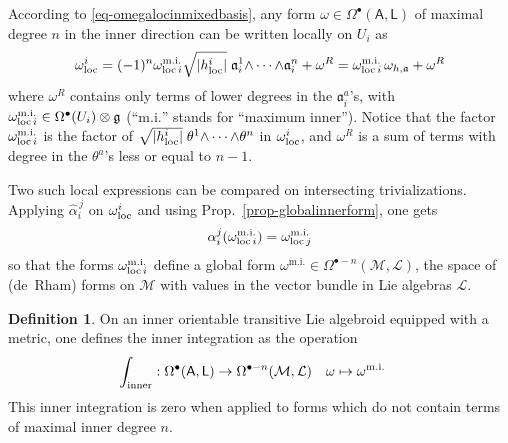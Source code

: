 \documentclass[number]{elsarticle}
\theoremstyle{definition}
\newtheorem{definition}[theorem]{Definition}
\theoremstyle{remark}
\numberwithin{equation}{section}
\begin{document}
According to \eqref{eq-omegalocinmixedbasis}, any form $\omega \in \Omega^{\bullet}({{{{\mathbf{\mathsf{{A}}}}}}}, {{{{\mathbf{\mathsf{{L}}}}}}})$ of maximal degree $n$ in the inner direction can be written locally on $U_i$ as 
\begin{equation*}
\omega^i_{{\text{\textup{loc}}}} = (-1)^n \omega^{{\text{m.i.}}}_{{{\text{\textup{loc}}}}\, i} \sqrt{|h^i_{{\text{\textup{loc}}}}|}\; {\mathfrak{a}}_i^{1} {\mathord{\wedge}} \cdots {\mathord{\wedge}} {\mathfrak{a}}_i^{n} + \omega^R
= \omega^{{\text{m.i.}}}_{{{\text{\textup{loc}}}}\, i}\, \omega_{h,{\mathfrak{a}}} + \omega^R
\end{equation*}
where $\omega^R$ contains only terms of lower degrees in the ${\mathfrak{a}}_i^a$'s, with $\omega^{{\text{m.i.}}}_{{{\text{\textup{loc}}}}\, i} \in \Omega^{\bullet}(U_i) \otimes {{\mathfrak g}}$ (``${{\text{m.i.}}}$'' stands for ``maximum inner''). Notice that the factor $\omega^{{\text{m.i.}}}_{{{\text{\textup{loc}}}}\, i}$ is the factor of $\sqrt{|h^i_{{\text{\textup{loc}}}}|}\; \theta^1 {\mathord{\wedge}} \cdots {\mathord{\wedge}} \theta^n$ in $\omega^i_{{\text{\textup{loc}}}}$, and $\omega^R$ is a sum of terms with degree in the $\theta^a$'s less or equal to $n-1$.

Two such local expressions can be compared on intersecting trivializations. Applying ${\widehat{\alpha}}_{i}^{\,j}$ on $\omega^i_{{\text{\textup{loc}}}}$ and using Prop.~\ref{prop-globalinnerform}, one gets
\begin{equation*}
\alpha^{j}_{i}(\omega^{{\text{m.i.}}}_{{{\text{\textup{loc}}}}\, i}) = \omega^{{\text{m.i.}}}_{{{\text{\textup{loc}}}}\, j}
\end{equation*}
so that the forms $\omega^{{\text{m.i.}}}_{{{\text{\textup{loc}}}}\, i}$ define a global form $\omega^{{\text{m.i.}}} \in \Omega^{{\bullet}-n}({{{{\mathcal{{M}}}}}}, {{{{\mathcal{{L}}}}}})$, the space of (de~Rham) forms on ${{{{\mathcal{{M}}}}}}$ with values in the vector bundle in Lie algebras ${{{{\mathcal{{L}}}}}}$.

\begin{definition}
\label{def-innerintegration}
On an inner orientable transitive Lie algebroid equipped with a metric, one defines the inner integration as the operation
\begin{align*}
\int_{{\text{\textup{inner}}}} : \Omega^{\bullet}({{{{\mathbf{\mathsf{{A}}}}}}},{{{{\mathbf{\mathsf{{L}}}}}}}) &\rightarrow \Omega^{{\bullet}-n}({{{{\mathcal{{M}}}}}}, {{{{\mathcal{{L}}}}}})
&
\omega &\mapsto \omega^{{\text{m.i.}}}
\end{align*}
This inner integration is zero when applied to forms which do not contain terms of maximal inner degree $n$.

\end{definition}
\end{document}
